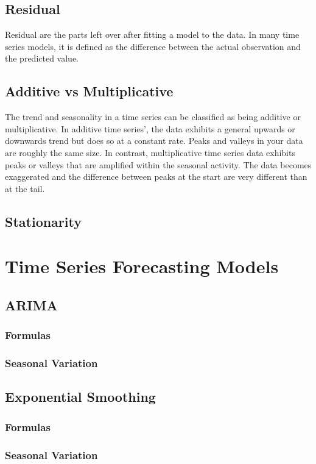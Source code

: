 \documentclass{article}
\begin{document}
  \subsection{Residual}
  Residual are the parts left over after fitting a model to the data. In many time series models, it is defined as the difference between the actual observation and the predicted value.
  \subsection{Additive vs Multiplicative}
  The trend and seasonality in a time series can be classified as being additive or multiplicative. 
  In additive time series', the data exhibits a general upwards or downwards trend but does so at a constant rate. Peaks and valleys in your data are roughly the same size.
  In contrast, multiplicative time series data exhibits peaks or valleys that are amplified within the seasonal activity. The data becomes exaggerated and the difference between peaks at the start are very different than at the tail.
  \subsection{Stationarity}

  \section{Time Series Forecasting Models}
  \subsection{ARIMA}
  \subsubsection{Formulas}
  \subsubsection{Seasonal Variation}
  \subsection{Exponential Smoothing}
  \subsubsection{Formulas}
  \subsubsection{Seasonal Variation}
\end{document}
